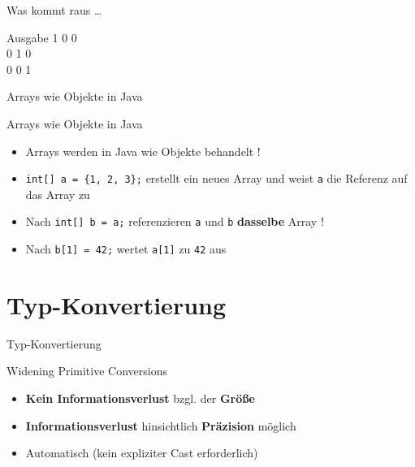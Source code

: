 \documentclass[18pt]{beamer}
\begin{document}
\begin{frame}{Was kommt raus \dots}
    \begin{exampleblock}{Ausgabe}
        1 0 0\\
        0 1 0\\
        0 0 1
    \end{exampleblock}
\end{frame}

\begin{frame}{Arrays wie Objekte in Java}
    \begin{alertblock}{Arrays wie Objekte in Java}
        \begin{itemize}
            \item Arrays werden in Java wie Objekte behandelt !
            \item \texttt{int[] a = \{1, 2, 3\};} erstellt ein neues Array und weist \texttt{a} die Referenz auf das Array zu
            \item Nach \texttt{int[] b = a;} referenzieren \texttt{a} und \texttt{b} \textbf{dasselbe} Array !
            \item Nach \texttt{b[1] = 42;} wertet \texttt{a[1]} zu \texttt{42} aus
        \end{itemize}

    \end{alertblock}

\end{frame}

\section{Typ-Konvertierung}

\begin{frame}{Typ-Konvertierung}
    \begin{block}{Widening Primitive Conversions}
        \begin{itemize}
            \item \textbf{Kein Informationsverlust} bzgl. der \textbf{Größe}
            \item \alert{\textbf{Informationsverlust}} hinsichtlich \alert{\textbf{Präzision}} möglich
            \item Automatisch (kein expliziter Cast erforderlich)
        \end{itemize}
    \end{block}

\end{frame}
\end{document}
